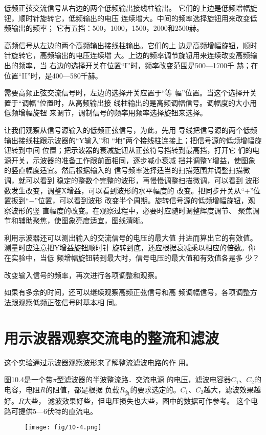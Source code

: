 低频正弦交流信号从右边的两个低频输出接线柱输出。
它们的上边是低频增幅旋钮，顺时针旋转它，低频输出的电压
连续增大。中间的频率选择旋钮用来改变低频输出的频率；
它有五挡：500，1000，1500，2000和2500赫。

高频信号从左边的两个高频输出接线柱输出。它们的上
边是高频增幅旋钮，顺时针旋转它，高频输出的电压连续增
大。上边的频率调节旋钮用来连续改变高频输出的频率，当
右边的选择开关在位置“I”时，频率改变范围是500—1700千
赫；在位置“II”时，是400—580千赫。

需要高频正弦交流信号时，左边的选择开关应置于“等
幅”位置。当这个选择开关置于“调幅”位置时，从高频输出接
线柱输出的是高频调幅信号。调幅度的大小用低频增幅旋钮
来调节，调制信号的频率用频率选择旋钮来选择。

让我们观察从信号源输入的低频正弦信号，为此，先用
导线把信号源的两个低频输出接线柱跟示波器的“Y输入”和
“地”两个接线柱连接上；把信号源的低频增幅旋钮转到中间
位置；把示波器的衰减旋钮从正弦符号挡转到最高挡，打开它
们的电源开关，示波器的准备工作跟前面相同，逐步减小衰减
挡并调整Y增益，使图象的竖直幅度适宜。然后根据输入的
信号频率选择适当的扫描范围并调整扫描微调，就可以看到
稳定的整数个完整的波形，再慢慢调整扫描微调，可以看到
波形数发生改变，调整X增益，可以看到波形的水平幅度的
改变。把同步开关从“$+$”位置扳到“$-$”位置，可以看到波形
改变半个周期。旋转信号源的低频增幅旋钮，观察波形的竖
直幅度的改变。在观察过程中，必要时应随时调整辉度调节、
聚焦调节和辅助聚焦，使图象亮度适宜，图线清晰。

利用示波器还可以测出输入的交流信号的电压的最大值
并进而算出它的有效值。测量时应注意把Y增益旋钮顺时针
旋转到底，还应根据衰减乘以相应的倍数。你在实验中，当低
频增幅旋钮转到最大时，信号电压的最大值和有效值各是多
少？

改变输入信号的频率，再次进行各项调整和观察。

如果有多余的时间，还可以继续观察高频正弦信号和高
频调幅信号，各项调整方法跟观察低频正弦信号时基本相
同。

\section{用示波器观察交流电的整流和滤波}

这个实验通过示波器观察波形来了解整流滤波电路的作
用。

图10.4是一个带$\pi$型滤波器的半波整流路．交流电源
的电压，滤波电容器$C_1$、$C_2$的电容，电阻$R$的阻值，都是根据
负载$R_{\text{负}}$的要求选定的。$C_1$、$C_2$越大，滤波效果越好。$R$大些，
滤波效果好些，但电压损失也大些，图中的数据可作参考。
这个电路可提供5—6伏特的直流电。
\begin{figure}[htp]\centering
    \texttt{[image: fig/10-4.png]}
    \caption{}
    \end{figure}

